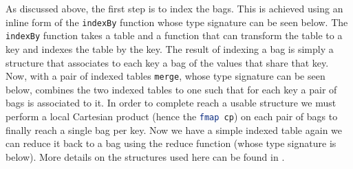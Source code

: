 As discussed above, the first step is to index the bags. This is achieved using
an inline form of the \lstinline[language=Haskell]{indexBy} function whose type
signature can be seen below. The \lstinline[language=Haskell]{indexBy} function
takes a table and a function that can transform the table to a key and indexes
the table by the key. The result of indexing a bag is simply a structure that
associates to each key a bag of the values that share that key. Now, with a pair of indexed tables
\lstinline[language=Haskell]{merge}, whose type signature can be seen below,
combines the two indexed tables to one such that for each key a pair of bags is
associated to it. In order to complete reach a usable structure we must perform
a local Cartesian product (hence the \lstinline[language=Haskell]{fmap cp}) on
each pair of bags to finally reach a single bag per key. Now we have a simple
indexed table again we can reduce it back to a bag using the reduce function
(whose type signature is below). More details on the structures used here can be
found in .


